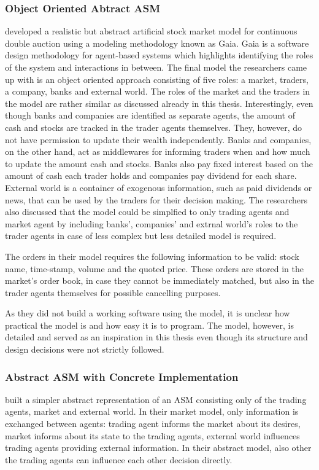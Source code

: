 \subsubsection{Object Oriented Abtract ASM}
\citet{Ben12} developed a realistic but abstract artificial stock market
model for continuous double auction using a modeling methodology known as 
Gaia. Gaia is a software design methodology for agent-based systems which 
highlights identifying the roles of the system and interactions in between.
The final model the researchers came up with is an object oriented 
approach consisting of five roles: a market, traders, a company, banks
and external world. The roles of the market and the traders in the model 
are rather similar as discussed already in this thesis. Interestingly,
even though banks and companies are identified as separate agents, 
the amount of cash and stocks are tracked in the trader agents themselves.
They, however, do not have permission to update their wealth independently. 
Banks and companies, on the other hand, act as middlewares for informing 
traders when and how much to update the amount cash and stocks. Banks also pay 
fixed interest based on the amount of cash each trader holds and companies 
pay dividend for each share. External world is a container of exogenous 
information, such as paid dividends or news, that can be used by the traders for 
their decision making. The researchers also discussed that the model could be
simplfied to only trading agents and market agent by including banks', companies' 
and extrnal world's roles to the trader agents in case of less complex but 
less detailed model is required.

The orders in their model requires the following information to be valid:
stock name, time-stamp, volume and the quoted price. These orders are stored
in the market's order book, in case they cannot be immediately matched, but 
also in the trader agents themselves for possible cancelling purposes.


As they did not build a working software using the model, it is unclear
how practical the model is and how easy it is to program. The model, 
however, is detailed and served as an inspiration in this thesis even though
its structure and design decisions were not strictly followed.


\subsubsection{Abstract ASM with Concrete Implementation}
\citet{Julien07} built a simpler abstract representation of an ASM consisting
only of the trading agents, market and external world. In their market model,
only information is exchanged between agents: trading agent informs the market
about its desires, market informs about its state to the trading agents, external
world influences trading agents providing external information. In their abstract 
model, also other the trading agents can influence each other decision directly. 

